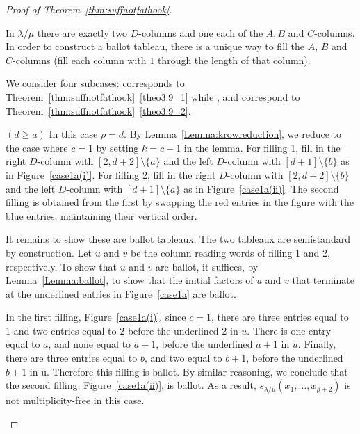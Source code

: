 \begin{proof}[Proof of Theorem~\ref{thm:suffnotfathook}]
\begin{Case}
In $\lambda / \mu$ there are exactly two $D$-columns and one each of the $A,B$ and $C$-columns. In order to construct a ballot tableau, there is a unique way to fill the $A$, $B$ and $C$-columns (fill each column with $1$ through the length of that column). 

We consider four subcases:  corresponds to Theorem~\ref{thm:suffnotfathook}~\ref{theo3.9_1} while ,  and  correspond to Theorem~\ref{thm:suffnotfathook}~\ref{theo3.9_2}. 
\end{Case}

\begin{Case}
{ $(d\geq a)$} 
In this case $\rho = d$. By Lemma~\ref{Lemma:krowreduction}, we reduce to the case where $c=1$ by setting $k = c-1$ in the lemma. For filling 1, fill in the right $D$-column with $[2,d+2]\setminus\{a\}$ and the left $D$-column with $[d+1]\setminus \{b\}$ as in Figure~\ref{case1a(i)}. For filling 2, fill in the right $D$-column with $[2,d+2]\setminus \{b\}$ and the left $D$-column with $[d+1]\setminus \{a\}$ as in Figure~\ref{case1a(ii)}. The second filling is obtained from the first by swapping the red entries in the figure with the blue entries, maintaining their vertical order.

It remains to show these are ballot tableaux. The two tableaux are semistandard by construction. Let $u$ and $v$ be the column reading words of filling 1 and 2, respectively. To show that $u$ and $v$ are ballot, it suffices, by Lemma~\ref{Lemma:ballot}, to show that the initial factors of $u$ and $v$ that terminate at the underlined entries in Figure~\ref{case1a} are ballot.

In the first filling, Figure~\ref{case1a(i)}, since $c=1$, there are three entries equal to $1$ and two entries equal to $2$ before the underlined $2$ in $u$. There is one entry equal to $a$, and none equal to $a+1$, before the underlined $a+1$ in $u$. Finally, there are three entries equal to $b$, and two equal to $b+1$, before the underlined $b+1$ in u. Therefore this filling is ballot. By similar reasoning, we conclude that the second filling, Figure~\ref{case1a(ii)}, is ballot. As a result, $s_{\lambda/\mu}(x_1,\ldots,x_{\rho+2})$ is not multiplicity-free in this case.


\begin{figure}[htb]\centering
 \begin{subfigure}{0.45\textwidth}
\end{subfigure}
\end{figure}
\end{Case}
\end{proof}
